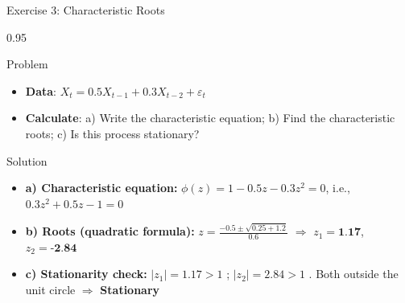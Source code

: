 \documentclass[9pt, aspectratio=169, t]{beamer}
\begin{document}
\begin{frame}{Exercise 3: Characteristic Roots}
    \begin{cminipage}{0.95\textwidth}
    \begin{alertblock}{Problem}
        \begin{itemize}\setlength{\itemsep}{0pt}
            \item \textbf{Data}: $X_t = 0.5X_{t-1} + 0.3X_{t-2} + \varepsilon_t$
            \item \textbf{Calculate}: a) Write the characteristic equation; b) Find the characteristic roots; c) Is this process stationary?
        \end{itemize}
    \end{alertblock}

    \vspace{0.2cm}
    \begin{exampleblock}{Solution}
        \begin{itemize}\setlength{\itemsep}{0pt}
            \item \textbf{a) Characteristic equation:} $\phi(z) = 1 - 0.5z - 0.3z^2 = 0$, i.e., $0.3z^2 + 0.5z - 1 = 0$
            \item \textbf{b) Roots (quadratic formula):} $z = \frac{-0.5 \pm \sqrt{0.25 + 1.2}}{0.6}$ $\Rightarrow$ $z_1 = \textbf{1.17}$, $z_2 = \textbf{-2.84}$
            \item \textbf{c) Stationarity check:} $|z_1| = 1.17 > 1$ \correct; \quad $|z_2| = 2.84 > 1$ \correct. Both outside the unit circle $\Rightarrow$ \textcolor{Forest}{\textbf{Stationary}}
        \end{itemize}
    \end{exampleblock}
    \end{cminipage}
\end{frame}
\end{document}
